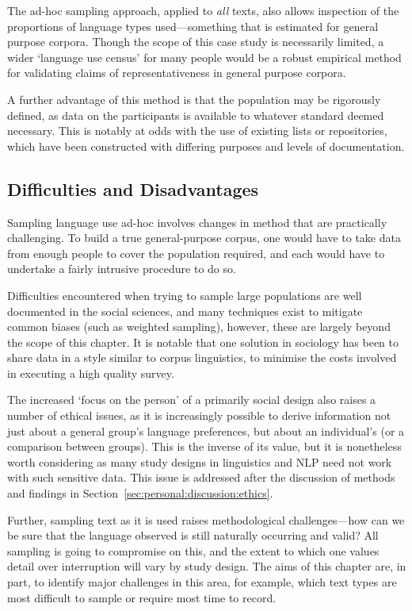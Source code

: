 The ad-hoc sampling approach, applied to \textsl{all} texts, also allows inspection of the proportions of language types used---something that is estimated for general purpose corpora.  Though the scope of this case study is necessarily limited, a wider `language use census' for many people would be a robust empirical method for validating claims of representativeness in general purpose corpora.


A further advantage of this method is that the population may be rigorously defined, as data on the participants is available to whatever standard deemed necessary.  This is notably at odds with the use of existing lists or repositories, which have been constructed with differing purposes and levels of documentation.






\subsection{Difficulties and Disadvantages}
Sampling language use ad-hoc involves changes in method that are practically challenging.  To build a true general-purpose corpus, one would have to take data from enough people to cover the population required, and each would have to undertake a fairly intrusive procedure to do so.

Difficulties encountered when trying to sample large populations are well documented in the social sciences, and many techniques exist to mitigate common biases (such as weighted sampling\cite{kalton1983introduction}), however, these are largely beyond the scope of this chapter.  It is notable that one solution in sociology has been to share data in a style similar to corpus linguistics, to minimise the costs involved in executing a high quality survey.

The increased `focus on the person' of a primarily social design also raises a number of ethical issues, as it is increasingly possible to derive information not just about a general group's language preferences, but about an individual's (or a comparison between groups).  This is the inverse of its value, but it is nonetheless worth considering as many study designs in linguistics and NLP need not work with such sensitive data.  This issue is addressed after the discussion of methods and findings in Section~\ref{sec:personal:discussion:ethics}.

Further, sampling text as it is used raises methodological challenges---how can we be sure that the language observed is still naturally occurring and valid?  All sampling is going to compromise on this, and the extent to which one values detail over interruption will vary by study design.  The aims of this chapter are, in part, to identify major challenges in this area, for example, which text types are most difficult to sample or require most time to record.


